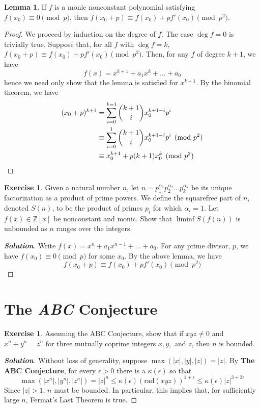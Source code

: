 \documentclass[12pt,leqno]{book}
\numberwithin{equation}{section}
\theoremstyle{definition}
\newtheorem{exer}[thm]{Exercise}
\newtheorem*{Lem}{Lemma}
\newenvironment{Solution}{\begin{proof}[\textnormal{\textbf{Solution}}]}{\end{proof}}
\begin{document}
\begin{Lem}
 If $f$ is a monic nonconstant polynomial satisfying $f(x_0)\equiv0\pmod{p}$, then $f(x_0+p)\equiv f(x_0)+pf'(x_0)\pmod{p^2}$.
\end{Lem}

\begin{proof}
 We proceed by induction on the degree of $f$. The case $\deg{f}=0$ is trivially true. Suppose that, for all $f$ with $\deg{f}=k$, $f(x_0+p)\equiv f(x_0)+pf'(x_0)\pmod{p^2}$. Then, for any $f$ of degree $k+1$, we have \[f(x)=x^{k+1}+a_1x^k+\hdots+a_0\] hence we need only show that the lemma is satisfied for $x^{k+1}$. By the binomial theorem, we have \begin{align*}(x_0+p)^{k+1}&=\sum_{i=0}^{k=1}{k+1\choose i}x_0^{k+1-i}p^i\\&\equiv\sum_{i=0}^1{k+1\choose i}x_0^{k+1-i}p^i\pmod{p^2}\\&\equiv x_0^{k+1}+p(k+1)x_0^k\pmod{p^2}\qedhere\end{align*}
\end{proof}

\begin{exer}
Given a natural number $n$, let $n=p_1^{\alpha_1}p_2^{\alpha_2}\hdots p_k^{\alpha_k}$ be its unique factorization as a product of prime powers. We define the squarefree part of $n$, denoted $S(n)$, to be the product of primes $p_i$ for which $\alpha_i=1$. Let $f(x)\in\mathbb{Z}[x]$ be nonconstant and monic. Show that $\liminf S(f(n))$ is unbounded as $n$ ranges over the integers. 
\end{exer}

\begin{Solution}
 Write $f(x)=x^n+a_1x^{n-1}+\hdots+a_0$. For any prime divisor, $p$, we have $f(x_0)\equiv0\pmod{p}$ for some $x_0$. By the above lemma, we have \[f(x_0+p)\equiv f(x_0)+pf'(x_0)\pmod{p^2}\]
\end{Solution}

\section{The \textit{ABC} Conjecture}

\begin{exer}
 Assuming the ABC Conjecture, show that if $xyz\not=0$ and $x^n+y^n=z^n$ for three mutually coprime integers $x,y,$ and $z$, then $n$ is bounded.
\end{exer}

\begin{Solution}
 Without loss of generality, suppose $\max(|x|,|y|,|z|)=|z|$. By \textbf{The ABC Conjecture}, for every $\epsilon>0$ there is a $\kappa(\epsilon)$ so that \[\max(|x^n|,|y^n|,|z^n|)=|z|^n\leq\kappa(\epsilon)\left(\text{rad}(xyz)\right)^{1+\epsilon}\leq\kappa(\epsilon)|z|^{3+3\epsilon}\] Since $|z|>1$, $n$ must be bounded. In particular, this implies that, for sufficiently large $n$, Fermat's Last Theorem is true.
\end{Solution}
\end{document}
